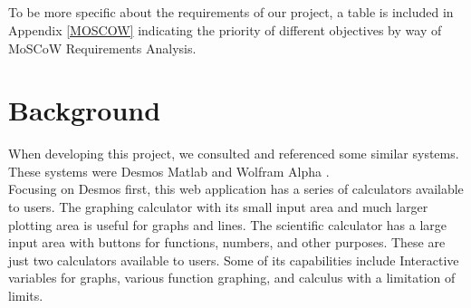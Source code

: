 \documentclass[a4paper, oneside, 11pt]{report}
\begin{document}
    \paragraph{}
    To be more specific about the requirements of our project, a table is included in Appendix \ref{MOSCOW} indicating the priority of different objectives by way of MoSCoW Requirements Analysis.


    \chapter{Background}

    When developing this project, we consulted and referenced some similar systems. These systems were Desmos \citep{Desmos:2023} Matlab \citep{Matlab:2023} and Wolfram Alpha \citep{Wolfram-Alpha:2025}. \\

    Focusing on Desmos first, this web application has a series of calculators available to users. The graphing calculator with its small input area and much larger plotting area is useful for graphs and lines. The scientific calculator has a large input area with buttons for functions, numbers, and other purposes. These are just two calculators available to users. Some of its capabilities include Interactive variables for graphs, various function graphing, and calculus with a limitation of limits. \\
\end{document}
